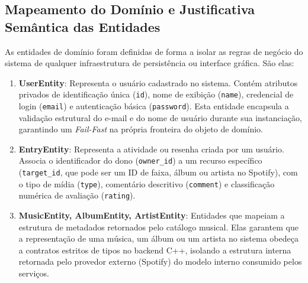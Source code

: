\documentclass[12pt,a4paper]{article}
\begin{document}
\subsection{Mapeamento do Domínio e Justificativa Semântica das Entidades}
As entidades de domínio foram definidas de forma a isolar as regras de negócio do sistema de qualquer infraestrutura de persistência ou interface gráfica. São elas:
\begin{enumerate}
    \item \textbf{UserEntity}: Representa o usuário cadastrado no sistema. Contém atributos privados de identificação única (\texttt{id}), nome de exibição (\texttt{name}), credencial de login (\texttt{email}) e autenticação básica (\texttt{password}). Esta entidade encapsula a validação estrutural do e-mail e do nome de usuário durante sua instanciação, garantindo um \textit{Fail-Fast} na própria fronteira do objeto de domínio.
    \item \textbf{EntryEntity}: Representa a atividade ou resenha criada por um usuário. Associa o identificador do dono (\texttt{owner\_id}) a um recurso específico (\texttt{target\_id}, que pode ser um ID de faixa, álbum ou artista no Spotify), com o tipo de mídia (\texttt{type}), comentário descritivo (\texttt{comment}) e classificação numérica de avaliação (\texttt{rating}).
    \item \textbf{MusicEntity, AlbumEntity, ArtistEntity}: Entidades que mapeiam a estrutura de metadados retornados pelo catálogo musical. Elas garantem que a representação de uma música, um álbum ou um artista no sistema obedeça a contratos estritos de tipos no backend C++, isolando a estrutura interna retornada pelo provedor externo (Spotify) do modelo interno consumido pelos serviços.
\end{enumerate}
\end{document}
